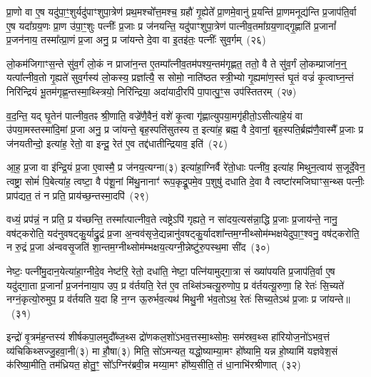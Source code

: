 प्रा॒णो वा ए॒ष यदु॑पा॒ꣳ॒शुर्यदु॑पाꣳशुपा॒त्रेण॑ प्रथ॒मश्चो᳚त्त॒मश्च॒ ग्रहौ॑ गृ॒ह्येते᳚ प्रा॒णमे॒वानु॑ प्र॒यन्ति॑ प्रा॒णमनूद्य॑न्ति प्र॒जा\-प॑ति॒र्वा ए॒ष यदा᳚ग्रय॒णः प्रा॒ण उ॑पा॒ꣳ॒शुः पत्नीः᳚ प्र॒जाः प्र ज॑नयन्ति॒ यदु॑पाꣳशुपा॒त्रेण॑ पात्नीव॒तमा᳚ग्रय॒णाद्गृ॒ह्णाति॑ प्र॒जानां᳚ प्र॒जन॑नाय॒ तस्मा᳚त्प्रा॒णं प्र॒जा अनु॒ प्र जा॑यन्ते दे॒वा वा इ॒तइ॑तः॒ पत्नीः᳚ सुव॒र्गम्~(२६)

लो॒कम॑जिगाꣳस॒न्ते सु॑व॒र्गं लो॒कं न प्राजा॑न॒न्त ए॒तम्पा᳚त्नीव॒तम॑पश्य॒न्तम॑गृह्णत॒ ततो॒ वै ते सु॑व॒र्गं लो॒कम्प्राजा॑न॒न्॒ यत्पा᳚त्नीव॒तो गृ॒ह्यते॑ सुव॒र्गस्य॑ लो॒कस्य॒ प्रज्ञा᳚त्यै॒ स सोमो॒ नाति॑ष्ठत स्त्री॒भ्यो गृ॒ह्यमा॑ण॒स्तं घृ॒तं वज्रं॑ कृ॒त्वाघ्न॒न्तं निरि॑न्द्रियं भू॒तम॑गृह्ण॒न्तस्मा॒थ्स्त्रियो॒ निरि॑न्द्रिया॒ अदा॑यादी॒रपि॑ पा॒पात्पु॒ꣳ॒स उप॑स्तितरम्~(२७)

व॒द॒न्ति॒ यद् घृ॒तेन॑ पात्नीव॒तꣴ श्री॒णाति॒ वज्रे॑णै॒वैनं॒ वशे॑ कृ॒त्वा गृ॑ह्णात्युपया॒मगृ॑हीतो॒\-ऽसीत्या॑हे॒यं वा उ॑पया॒मस्तस्मा॑दि॒मां प्र॒जा अनु॒ प्र जा॑यन्ते॒ बृह॒स्पति॑सुतस्य त॒ इत्या॑ह॒ ब्रह्म॒ वै दे॒वानां॒ बृह॒स्पति॒र्ब्रह्म॑णै॒वास्मै᳚ प्र॒जाः प्र ज॑नयतीन्दो॒ इत्या॑ह॒ रेतो॒ वा इन्दू॒ रेत॑ ए॒व तद्द॑धातीन्द्रियाव॒ इति॑~(२८)

आ॒ह॒ प्र॒जा वा इ॑न्द्रि॒यं प्र॒जा ए॒वास्मै॒ प्र ज॑नय॒त्यग्ना(३) इत्या॑हा॒ग्निर्वै रे॑तो॒धाः पत्नी॑व॒ इत्या॑ह मिथुन॒त्वाय॑ स॒जूर्दे॒वेन॒ त्वष्ट्रा॒ सोमं॑ पि॒बेत्या॑ह॒ त्वष्टा॒ वै प॑शू॒नां मि॑थु॒नानाꣳ॑ रूप॒कृद्रू॒पमे॒व प॒शुषु॑ दधाति दे॒वा वै त्वष्टा॑रमजिघाꣳस॒न्थ्स पत्नीः॒ प्राप॑द्यत॒ तं न प्रति॒ प्राय॑च्छ॒न्तस्मा॒दपि॑~(२९)

वध्यं॒ प्रप॑न्नं॒ न प्रति॒ प्र य॑च्छन्ति॒ तस्मा᳚त्पात्नीव॒ते त्वष्ट्रे\-ऽपि॑ गृह्यते॒ न सा॑दय॒त्यस॑न्ना॒द्धि प्र॒जाः प्र॒जाय॑न्ते॒ नानु॒ वष॑ट्करोति॒ यद॑नुवषट्कु॒र्याद्रु॒द्रं प्र॒जा अ॒न्वव॑सृजे॒द्यन्नानु॑वषट्कु॒र्यादशा᳚न्तम॒ग्नीथ्सोम॑म्भक्षयेदुपा॒ꣳ॒श्वनु॒ वष॑ट्करोति॒ न रु॒द्रं प्र॒जा अ॑न्ववसृ॒जति॑ शा॒न्तम॒ग्नीथ्सोम॑म्भक्षय॒त्यग्नी॒न्नेष्टु॑रु॒पस्थ॒मा सी॑द~(३०)

नेष्टः॒ पत्नी॑मु॒दान॒येत्या॑हा॒ग्नीदे॒व नेष्ट॑रि॒ रेतो॒ दधा॑ति॒ नेष्टा॒ पत्नि॑यामुद्गा॒त्रा सं ख्या॑पयति प्र॒जा\-प॑ति॒र्वा ए॒ष यदु॑द्गा॒ता प्र॒जानां᳚ प्र॒जन॑नाया॒प उप॒ प्र व॑र्तयति॒ रेत॑ ए॒व तथ्सि॑ञ्चत्यू॒रुणोप॒ प्र व॑र्तयत्यू॒रुणा॒ हि रेतः॑ सि॒च्यते॑ नग्नं॒कृत्यो॒रुमुप॒ प्र व॑र्तयति य॒दा हि न॒ग्न ऊ॒रुर्भव॒त्यथ॑ मिथु॒नी भ॑व॒तो\-ऽथ॒ रेतः॑ सिच्य॒ते\-ऽथ॑ प्र॒जाः प्र जा॑यन्ते॥~(३१)

{\anuvakamend[{पत्नीः᳚ सुव॒र्गमुप॑स्तितरमिन्द्रियाव॒ इत्यपि॑ सीद मिथु॒न्य॑ष्टौ च॑}]}%

इन्द्रो॑ वृ॒त्रम॑ह॒न्तस्य॑ शीर्\mbox{}षकपा॒लमुदौ᳚ब्ज॒थ्स द्रो॑णकल॒शो॑\-ऽभव॒त्तस्मा॒थ्सोमः॒ सम॑स्रव॒थ्स हा॑रियोज॒नो॑\-ऽभव॒त्तं व्य॑चिकिथ्सज्जु॒हवा॒नी(३) मा हौ॒षा(३) मिति॒ सो॑\-ऽमन्यत॒ यद्धो॒ष्याम्या॒मꣳ हो᳚ष्यामि॒ यन्न हो॒ष्यामि॑ यज्ञवेश॒सं क॑रिष्या॒मीति॒ तम॑ध्रियत॒ होतु॒ꣳ॒ सो᳚\-ऽग्निर॑ब्रवी॒न्न मय्या॒मꣳ हो᳚ष्य॒सीति॒ तं धा॒नाभि॑रश्रीणात्~(३२)

